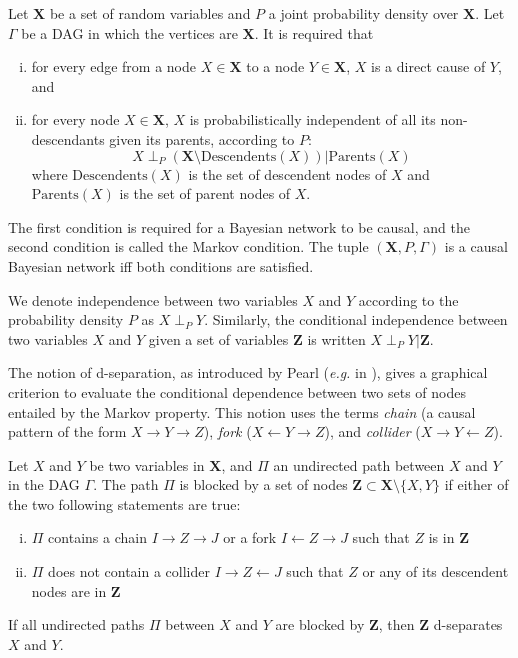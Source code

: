 \begin{definition}

Let $\bm X$ be a set of random variables and $P$ a joint
probability density over $\bm X$. Let $\Gamma$ be a DAG in which the vertices
are $\bm X$. It is required that
\begin{enumerate}[(i)]
    \item for every edge from a node $X\in\bm X$ to a node $Y\in\bm X$, $X$ is a
    direct cause of $Y$, and
    \item for every node $X\in\bm X$, $X$ is probabilistically independent of
    all its non-descendants given its parents, according to $P$:
    \begin{equation}
        X \perp_P (\bm X \setminus \text{Descendents}(X)) | \text{Parents}(X)
    \end{equation}
    where $\text{Descendents}(X)$ is the set of descendent nodes of $X$ and
    $\text{Parents}(X)$ is the set of parent nodes of $X$.
\end{enumerate}
The first condition is required for a Bayesian network to be causal, and the
second condition is called the Markov condition. The tuple $(\bm X, P, \Gamma)$
is a causal Bayesian network iff both conditions are satisfied.

\end{definition}

We denote independence between two variables $X$ and $Y$ according to the
probability density $P$ as $X\perp_P Y$. Similarly, the conditional independence
between two variables $X$ and $Y$ given a set of variables $\bm Z$ is written
$X\perp_P Y|\bm Z$.

The notion of d-separation, as introduced by Pearl (\emph{e.g.} in
\cite{pearl2002causality}), gives a graphical criterion to evaluate the
conditional dependence between two sets of nodes entailed by the Markov
property. This notion uses the terms \emph{chain} (a causal pattern of the form
$X\rightarrow Y\rightarrow Z$), \emph{fork} ($X\leftarrow Y\rightarrow Z$), and
\emph{collider} ($X\rightarrow Y\leftarrow Z$).

\begin{definition}[d-separation]
    Let $X$ and $Y$ be two variables in $\bm X$, and $\Pi$ an undirected path
    between $X$ and $Y$ in the DAG $\Gamma$. The path $\Pi$ is blocked by a set
    of nodes $\bm Z\subset\bm X\setminus\{X, Y\}$ if either of the two following
    statements are true:
    \begin{enumerate}[(i)]
        \item $\Pi$ contains a chain $I\rightarrow Z\rightarrow J$ or a fork
        $I\leftarrow Z\rightarrow J$ such that $Z$ is in $\bm Z$
        \item $\Pi$ does not contain a collider $I\rightarrow Z\leftarrow J$
        such that $Z$ or any of its descendent nodes are in $\bm Z$
    \end{enumerate}
    If all undirected paths $\Pi$ between $X$ and $Y$ are blocked by $\bm Z$,
    then $\bm Z$ d-separates $X$ and $Y$.
\end{definition}

